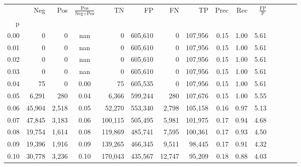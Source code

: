 \begin{tabular}{rrrcrrrrrrrrrrr}
\toprule
{} &     Neg &    Pos & $\frac{\text{Pos}}{\text{Neg}+\text{Pos}}$ &       TN &       FP &       FN &       TP &  Prec &   Rec & $\frac{\text{FP}}{\text{P}}$ \\
p    &         &        &                                            &          &          &          &          &       &       &                              \\
\midrule
0.00 &       0 &      0 &                                        nan &        0 &  605,610 &        0 &  107,956 &  0.15 &  1.00 &                         5.61 \\
0.01 &       0 &      0 &                                        nan &        0 &  605,610 &        0 &  107,956 &  0.15 &  1.00 &                         5.61 \\
0.02 &       0 &      0 &                                        nan &        0 &  605,610 &        0 &  107,956 &  0.15 &  1.00 &                         5.61 \\
0.03 &       0 &      0 &                                        nan &        0 &  605,610 &        0 &  107,956 &  0.15 &  1.00 &                         5.61 \\
0.04 &      75 &      0 &                                       0.00 &       75 &  605,535 &        0 &  107,956 &  0.15 &  1.00 &                         5.61 \\
0.05 &   6,291 &    280 &                                       0.04 &    6,366 &  599,244 &      280 &  107,676 &  0.15 &  1.00 &                         5.55 \\
0.06 &  45,904 &  2,518 &                                       0.05 &   52,270 &  553,340 &    2,798 &  105,158 &  0.16 &  0.97 &                         5.13 \\
0.07 &  47,845 &  3,183 &                                       0.06 &  100,115 &  505,495 &    5,981 &  101,975 &  0.17 &  0.94 &                         4.68 \\
0.08 &  19,754 &  1,614 &                                       0.08 &  119,869 &  485,741 &    7,595 &  100,361 &  0.17 &  0.93 &                         4.50 \\
0.09 &  19,396 &  1,916 &                                       0.09 &  139,265 &  466,345 &    9,511 &   98,445 &  0.17 &  0.91 &                         4.32 \\
0.10 &  30,778 &  3,236 &                                       0.10 &  170,043 &  435,567 &   12,747 &   95,209 &  0.18 &  0.88 &                         4.03 \\

\end{tabular}
